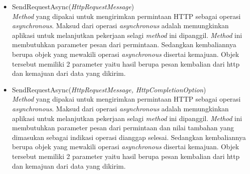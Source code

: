\begin{itemize}
	\item SendRequestAsync(\textit{HttpRequestMessage}) \\
	\textit{Method} yang dipakai untuk mengirimkan permintaan HTTP sebagai operasi \textit{asynchronous}. Maksud dari operasi \textit{asynchronous} adalah memungkinkan aplikasi untuk melanjutkan pekerjaan selagi \textit{method} ini dipanggil\footnotemark[2]. \textit{Method} ini membutuhkan parameter pesan dari permintaan. Sedangkan kembaliannya berupa objek yang mewakili operasi \textit{asynchronous} disertai kemajuan. Objek tersebut memiliki 2 parameter yaitu hasil berupa pesan kembalian dari http dan kemajuan dari data yang dikirim.
	\item SendRequestAsync(\textit{HttpRequestMessage, HttpCompletionOption}) \\
	\textit{Method} yang dipakai untuk mengirimkan permintaan HTTP sebagai operasi \textit{asynchronous}. Maksud dari operasi \textit{asynchronous} adalah memungkinkan aplikasi untuk melanjutkan pekerjaan selagi \textit{method} ini dipanggil\footnotemark[2]. \textit{Method} ini membutuhkan parameter pesan dari permintaan dan nilai tambahan yang dimasukan sebagai indikasi operasi dianggap selesai. Sedangkan kembaliannya berupa objek yang mewakili operasi \textit{asynchronous} disertai kemajuan. Objek tersebut memiliki 2 parameter yaitu hasil berupa pesan kembalian dari http dan kemajuan dari data yang dikirim.
\end{itemize}


